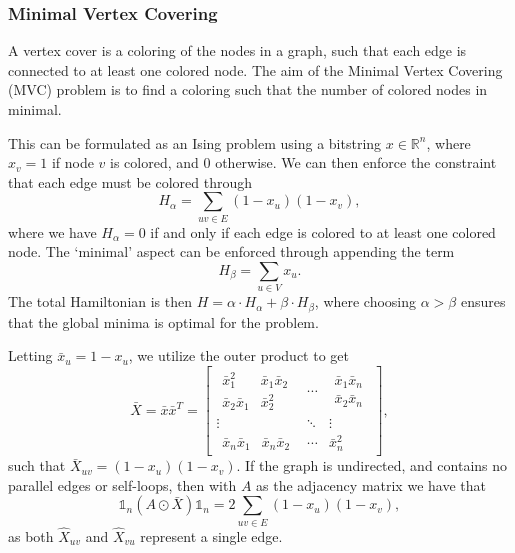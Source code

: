 \subsubsection{Minimal Vertex Covering}
A vertex cover is a coloring of the nodes in a graph, such that each edge is connected to at least one colored node.
The aim of the Minimal Vertex Covering (MVC) problem is to find a coloring such that the number of colored nodes in minimal.

This can be formulated as an Ising problem using a bitstring $x \in \mathbb{R}^n$, where $x_v = 1$ if node $v$ is colored, and $0$ otherwise.
We can then enforce the constraint that each edge must be colored through
\begin{equation}\label{eq:edge_cover}
    H_{\alpha} = \sum_{uv \in E} (1 - x_u) (1 - x_v),
\end{equation}
where we have $H_{\alpha} = 0$ if and only if each edge is colored to at least one colored node.
The `minimal' aspect can be enforced through appending the term
\begin{equation}
    H_{\beta} = \sum_{u \in V} x_u.
\end{equation}
The total Hamiltonian is then $H = \alpha \cdot H_{\alpha} + \beta \cdot H_{\beta}$, where choosing $\alpha > \beta$ ensures that the global minima is optimal for the problem.

Letting $\bar{x}_u = 1 - x_u$, we utilize the outer product to get
\begin{equation}
    \bar{X} = \bar{x} \bar{x}^T =
    \begin{bmatrix}
        \begin{matrix}
            \bar{x}_1^2 & \bar{x}_1 \bar{x}_2 \\
            \bar{x}_2 \bar{x}_1 & \bar{x}_2^2
        \end{matrix}
         & \cdots & 
         \begin{matrix}
            \bar{x}_1 \bar{x}_n \\
            \bar{x}_2 \bar{x}_n
         \end{matrix} \\
        \vdots & \ddots & \vdots \\
        \begin{matrix}
            \bar{x}_n \bar{x}_1 & \bar{x}_n \bar{x}_2 
        \end{matrix}
        & \cdots & \bar{x}_n^2
    \end{bmatrix},
\end{equation}
such that $\bar{X}_{uv} = (1 - x_u)(1 - x_v)$.
If the graph is undirected, and contains no parallel edges or self-loops, then with $A$ as the adjacency matrix we have that
\begin{equation}
    \mathds{1}_n \left( A \odot \bar{X} \right) \mathds{1}_n = 2 \sum_{uv \in E} (1 - x_u) (1 - x_v),
\end{equation}
as both $\hat{X}_{uv}$ and $\hat{X}_{vu}$ represent a single edge.

